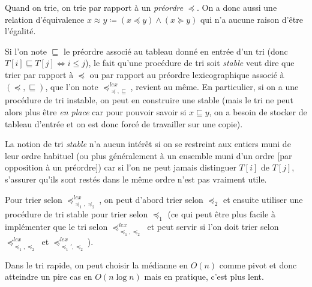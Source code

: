 \documentclass[../../Agregation.tex]{subfiles}
\begin{document}
Quand on trie, on trie par rapport à un \emph{préordre} $\preccurlyeq$. On a donc aussi une relation d'équivalence $x\approx y\coloneqq (x\preccurlyeq y) \land (x\succcurlyeq y)$ qui n'a aucune raison d'être l'égalité.

Si l'on note $\sqsubseteq$ le préordre associé au tableau donné en entrée d'un tri (donc $T[i]\sqsubseteq T[j] \iff i \le j$), le fait qu'une procédure de tri soit \emph{stable} veut dire que trier par rapport à $\preccurlyeq$ ou par rapport au préordre lexicographique associé à $(\preccurlyeq, \sqsubseteq)$, que l'on note $\preccurlyeq^{lex}_{\preccurlyeq, \sqsubseteq}$, revient au même. En particulier, si on a une procédure de tri instable, on peut en construire une stable (mais le tri ne peut alors plus être \emph{en place} car pour pouvoir savoir si $x\sqsubseteq y$, on a besoin de stocker de tableau d'entrée et on est donc forcé de travailler sur une copie).

La notion de tri \emph{stable} n'a aucun intérêt si on se restreint aux entiers muni de leur ordre habituel (ou plus généralement à un ensemble muni d'un ordre [par opposition à un préordre]) car si l'on ne peut jamais distinguer $T[i]$ de $T[j]$, s'assurer qu'ils sont restés dans le même ordre n'est pas vraiment utile.

Pour trier selon $\preccurlyeq^{lex}_{\preccurlyeq_1, \preccurlyeq_2}$, on peut d'abord trier selon $\preccurlyeq_2$ et ensuite utiliser une procédure de tri stable pour trier selon $\preccurlyeq_1$ (ce qui peut être plus facile à implémenter que le tri selon $\preccurlyeq^{lex}_{\preccurlyeq_1, \preccurlyeq_2}$ et peut servir si l'on doit trier selon $\preccurlyeq^{lex}_{\preccurlyeq_1, \preccurlyeq_2}$ et $\preccurlyeq^{lex}_{\preccurlyeq_1', \preccurlyeq_2}$).

Dans le tri rapide, on peut choisir la médianne en $O(n)$ comme pivot et donc atteindre un pire cas en $O(n\log n)$ mais en pratique, c'est plus lent.
\end{document}
